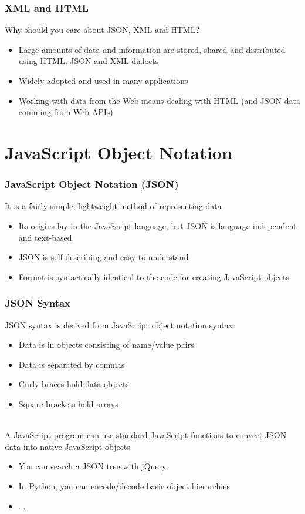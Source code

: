 \documentclass[svgnames]{beamer}
\begin{document}

\begin{frame}
\frametitle{XML and HTML}

Why should you care about JSON, XML and HTML?
\begin{itemize}
  \item Large amounts of data and information are stored, shared and distributed using HTML, JSON and XML dialects
  \item Widely adopted and used in many applications
  \item Working with data from the Web means dealing with HTML (and JSON data comming from Web APIs)
\end{itemize}

\end{frame}

\section{JavaScript Object Notation}

\begin{frame}
\frametitle{JavaScript Object Notation (JSON)}

It is a fairly simple, lightweight method of representing data
\begin{itemize}
  \item Its origins lay in the JavaScript language, but JSON is language independent and text-based
  \item JSON is self-describing and easy to understand
  \item Format is syntactically identical to the code for creating JavaScript objects
\end{itemize}

\end{frame}


\begin{frame}
\frametitle{JSON Syntax}

JSON syntax is derived from JavaScript object notation syntax:
\begin{itemize}
  \item Data is in objects consisting of name/value pairs
  \item Data is separated by commas
  \item Curly braces hold data objects
  \item Square brackets hold arrays
\end{itemize}

~\\
A JavaScript program can use standard JavaScript functions to convert JSON data into native JavaScript objects

\begin{itemize}
\item You can search a JSON tree with jQuery
\item In Python, you can encode/decode basic object hierarchies
\item ...
\end{itemize}

\end{frame}
\end{document}
